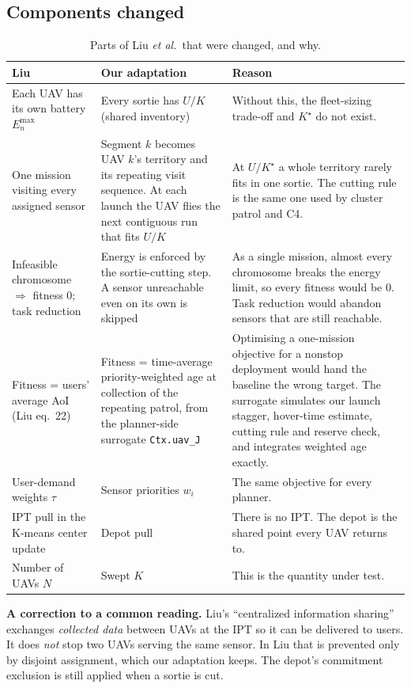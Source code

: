 \documentclass[10pt,a4paper]{article}
\begin{document}
\subsection{Components changed}
\begin{table}[H]\centering\small
\begin{tabularx}{\linewidth}{>{\raggedright\arraybackslash}p{3.6cm}>{\raggedright\arraybackslash}p{4.4cm}L}
\toprule
Liu & Our adaptation & Reason\\
\midrule
Each UAV has its own battery $E^{\max}_n$ & Every sortie has $U/K$ (shared inventory) & Without this, the fleet-sizing trade-off and $K^\star$ do not exist.\\
One mission visiting every assigned sensor & Segment $k$ becomes UAV $k$'s territory and its repeating visit sequence. At each launch the UAV flies the next contiguous run that fits $U/K$ & At $U/K^\star$ a whole territory rarely fits in one sortie. The cutting rule is the same one used by cluster patrol and C4.\\
Infeasible chromosome $\Rightarrow$ fitness $0$; task reduction & Energy is enforced by the sortie-cutting step. A sensor unreachable even on its own is skipped & As a single mission, almost every chromosome breaks the energy limit, so every fitness would be 0. Task reduction would abandon sensors that are still reachable.\\
Fitness = users' average AoI (Liu eq.~22) & Fitness = time-average priority-weighted age at collection of the repeating patrol, from the planner-side surrogate \texttt{Ctx.uav\_J} & Optimising a one-mission objective for a nonstop deployment would hand the baseline the wrong target. The surrogate simulates our launch stagger, hover-time estimate, cutting rule and reserve check, and integrates weighted age exactly.\\
User-demand weights $\tau$ & Sensor priorities $w_i$ & The same objective for every planner.\\
IPT pull in the K-means center update & Depot pull & There is no IPT. The depot is the shared point every UAV returns to.\\
Number of UAVs $N$ & Swept $K$ & This is the quantity under test.\\
\bottomrule
\end{tabularx}
\caption{Parts of Liu \emph{et al.}\ that were changed, and why.}
\end{table}

\noindent\textbf{A correction to a common reading.} Liu's ``centralized information sharing'' exchanges
\emph{collected data} between UAVs at the IPT so it can be delivered to users. It does \emph{not} stop
two UAVs serving the same sensor. In Liu that is prevented only by disjoint assignment, which our
adaptation keeps. The depot's commitment exclusion is still applied when a sortie is cut.
\end{document}

